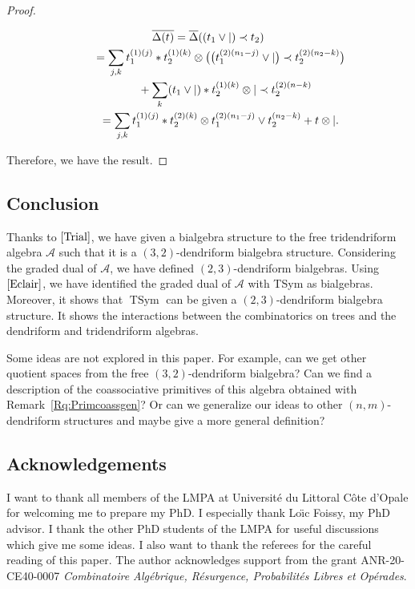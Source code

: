\documentclass[pdftex]{sigma}
\numberwithin{equation}{section}
\theoremstyle{definition}
\theoremstyle{plain}
\DeclareMathOperator{\TSym}{TSym}
\begin{document}
\begin{proof}
\begin{itemize}
	\begin{gather*}
		\overline{\Delta(t)}
		 =\overline{\Delta}((t_1\vee |)\prec t_2) \\
		 \hphantom{\overline{\Delta(t)}}{}=\sum_{j,k} t_1^{(1)(j)}* t_2^{(1)(k)}\otimes \big( \big(t_1^{(2)(n_1-j)}\vee |\big)\prec t_2^{(2)(n_2-k)}\big) \\
		 \hphantom{\overline{\Delta(t)=}}{}+\sum_k (t_1\vee |)*t_2^{(1)(k)}\otimes |\prec t_2^{(2)(n-k)} \\
		 \hphantom{\overline{\Delta(t)}}{}=\sum_{j,k} t_1^{(1)(j)}* t_2^{(2)(k)}\otimes t_1^{(2)(n_1-j)}\vee t_2^{(n_2-k)}+t\otimes |.
	\end{gather*}
\end{itemize}
Therefore, we have the result.
\end{proof}


\subsection{Conclusion}

Thanks to $\cite{Trial}$, we have given a bialgebra structure to the free tridendriform algebra $\mathcal{A}$ such that it is a $(3,2)$-dendriform bialgebra structure. Considering the graded dual of $\mathcal{A}$, we have defined $(2,3)$-dendriform bialgebras.
Using $\cite{Eclair}$, we have identified the graded dual of $\mathcal{A}$ with TSym as bialgebras. Moreover, it shows that $\TSym$ can be given a $(2,3)$-dendriform bialgebra structure. It shows the interactions between the combinatorics on trees and the dendriform and tridendriform algebras.

Some ideas are not explored in this paper. For example, can we get other quotient spaces from the free $(3,2)$-dendriform bialgebra? Can we find a description of the coassociative primitives of this algebra obtained with Remark~\ref{Rq:Primcoassgen}? Or can we generalize our ideas to other $(n,m)$-dendriform structures and maybe give a more general definition?

\subsection*{Acknowledgements}

I want to thank all members of the LMPA at Universit\'e du Littoral C\^ote d'Opale for welcoming me to prepare my PhD. I especially thank Lo\"{\i}c Foissy, my PhD advisor.
I thank the other PhD students of the LMPA for useful discussions which give me some ideas. I also want to thank the referees for the careful reading of this paper.
The author acknowledges support from the grant ANR-20-CE40-0007
\emph{Combinatoire Alg\'ebrique, R\'esurgence, Probabilit\'es Libres et Op\'erades}.
\end{document}
